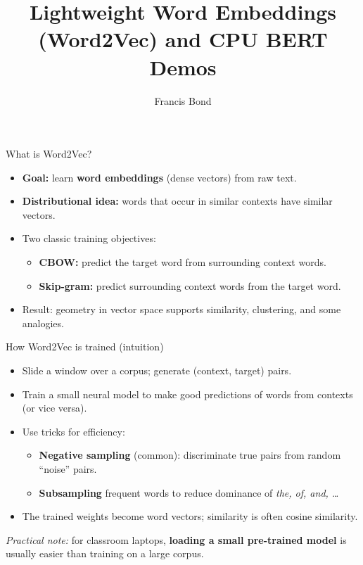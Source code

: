 \documentclass[aspectratio=169]{beamer}
\title{Lightweight Word Embeddings (Word2Vec) and CPU BERT Demos}
\author{Francis Bond}
\date{}
\begin{document}
\begin{frame}
  \titlepage
\end{frame}

\begin{frame}{What is Word2Vec?}
\begin{itemize}
  \item \textbf{Goal:} learn \textbf{word embeddings} (dense vectors) from raw text.
  \item \textbf{Distributional idea:} words that occur in similar contexts have similar vectors.
  \item Two classic training objectives:
    \begin{itemize}
      \item \textbf{CBOW:} predict the target word from surrounding context words.
      \item \textbf{Skip-gram:} predict surrounding context words from the target word.
    \end{itemize}
  \item Result: geometry in vector space supports similarity, clustering, and some analogies.
\end{itemize}
\end{frame}

\begin{frame}{How Word2Vec is trained (intuition)}
\begin{itemize}
  \item Slide a window over a corpus; generate (context, target) pairs.
  \item Train a small neural model to make good predictions of words from contexts (or vice versa).
  \item Use tricks for efficiency:
    \begin{itemize}
      \item \textbf{Negative sampling} (common): discriminate true pairs from random “noise” pairs.
      \item \textbf{Subsampling} frequent words to reduce dominance of \textit{the, of, and, \dots}
    \end{itemize}
  \item The trained weights become word vectors; similarity is often cosine similarity.
\end{itemize}

\vspace{0.5em}
\small
\textit{Practical note:} for classroom laptops, \textbf{loading a small pre-trained model} is usually easier than training on a large corpus.
\end{frame}
\end{document}
